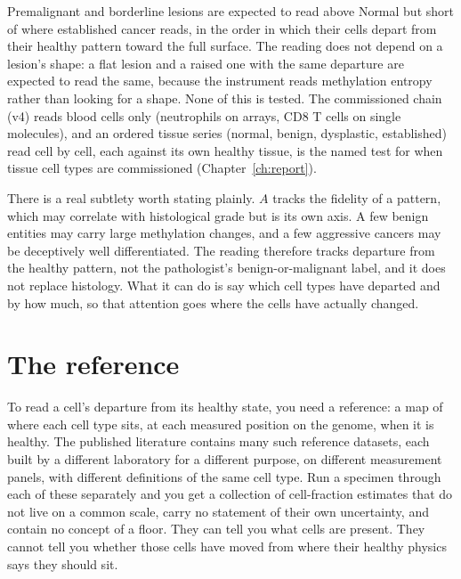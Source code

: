 Premalignant and borderline lesions are expected to read above Normal but short of where established cancer reads, in the order in which
their cells depart from their healthy pattern toward the full surface. \prediction{} The reading does not depend on a lesion's shape: a flat lesion and a raised one with the same
departure are expected to read the same, because the instrument reads methylation entropy rather than looking for a shape.
\prediction{} None of this is tested. The commissioned chain (v4) reads blood cells only (neutrophils on arrays, CD8 T cells on single molecules), and an ordered tissue series (normal, benign, dysplastic,
established) read cell by cell, each against its own healthy tissue, is the named test for when tissue cell types are commissioned
(Chapter~\ref{ch:report}). \openprob

There is a real subtlety worth stating plainly. $A$ tracks the fidelity of a pattern, which may correlate with histological grade but is
its own axis. A few benign entities may carry large methylation changes, and a few aggressive cancers may be deceptively well
differentiated. The reading therefore tracks departure from the healthy pattern, not the pathologist's benign-or-malignant label, and it does not replace
histology. What it can do is say which cell types have departed and by how much, so that attention goes where the cells have actually
changed. \interp

\section{The reference}\label{sec:ag_reference}

To read a cell's departure from its healthy state, you need a reference: a map of where each cell type sits, at each measured position on
the genome, when it is healthy. The published literature contains many such reference datasets, each built by a different laboratory for
a different purpose, on different measurement panels, with different definitions of the same cell type. Run a specimen through each of
these separately and you get a collection of cell-fraction estimates that do not live on a common scale, carry no statement of their own
uncertainty, and contain no concept of a floor. They can tell you what cells are present. They cannot tell you whether those cells have
moved from where their healthy physics says they should sit. \interp

